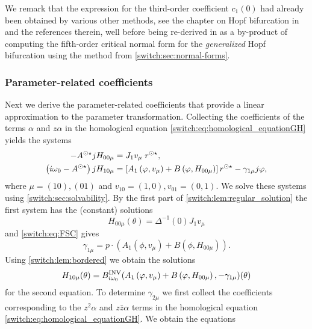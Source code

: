 We remark that the expression for the third-order coefficient $c_1(0)$ had already been obtained by various other methods, see the chapter on Hopf bifurcation in \cite{diekmann1995delay} and the references therein, well before being re-derived in \cite{Janssens:Thesis} as a by-product of computing the fifth-order critical normal form for the \emph{generalized} Hopf bifurcation using the method from \cref{switch:sec:normal-forms}.

\subsubsection{Parameter-related coefficients}
Next we derive the parameter-related coefficients that provide a linear approximation to the parameter transformation. Collecting the coefficients of the terms $\alpha$ and $z\alpha$ in the homological equation \cref{switch:eq:homological_equationGH} yields the systems
\begin{align*}
-A^{\odot\star} jH_{00\mu} & =J_{1}v_{\mu} \; r^{\odot\star},\\
\left(i\omega_{0}-A^{\odot\star}\right) j H_{10\mu}
	& = \left[ A_1\left(\varphi,v_{\mu}\right)+B\left(\varphi,H_{00\mu}\right) \right] r^{\odot\star}-\gamma_{1\mu}j\varphi,
\end{align*}
where $\mu=(10),(01)$ and $v_{10}=(1,0),v_{01}=(0,1)$. We solve these systems using \cref{switch:sec:solvability}. By the first part of \cref{switch:lem:regular_solution} the first system has the (constant) solutions
\[
H_{00\mu}(\theta)=\Delta^{-1}(0)J_{1}v_{\mu}
\]
and \cref{switch:eq:FSC} gives
\[
\gamma_{1\mu}=p\cdot \left(A_{1}\left(\phi,v_{\mu}\right)+B\left(\phi,H_{00\mu}\right)\right).
\]
Using \cref{switch:lem:bordered} we obtain the solutions
\[
H_{10\mu}(\theta)=B^{\mathrm{INV}}_{i\omega_{0}}(A_{1}\left(\varphi,v_{\mu}\right)+B\left(\varphi,H_{00\mu}\right),-\gamma_{1\mu})(\theta)
\]
for the second equation. To determine $\gamma_{2\mu}$ we first collect the coefficients corresponding to the $z^{2}\alpha$ and $z\bar{z}\alpha$ terms in the homological equation \cref{switch:eq:homological_equationGH}. We obtain the equations
